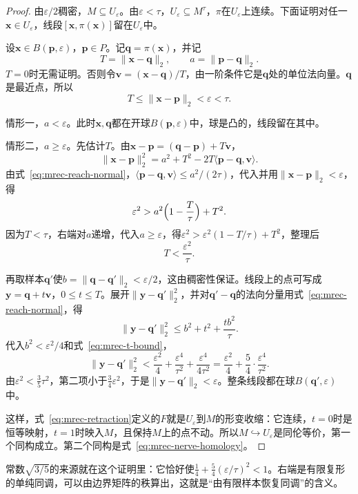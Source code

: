 \begin{proof}
由$\varepsilon/2$稠密，$M\subseteq U_\varepsilon$。由$\varepsilon<\tau$，$U_\varepsilon\subseteq M^\tau$，$\pi$在$U_\varepsilon$上连续。下面证明对任一$\bm x\in U_\varepsilon$，线段$[\bm x,\pi(\bm x)]$留在$U_\varepsilon$中。

设$\bm x\in B(\bm p,\varepsilon)$，$\bm p\in P$。记$\bm q=\pi(\bm x)$，并记
\[
 T=\lVert\bm x-\bm q\rVert_2,\qquad a=\lVert\bm p-\bm q\rVert_2 .
\]
$T=0$时无需证明。否则令$\bm v=(\bm x-\bm q)/T$，由一阶条件它是$\bm q$处的单位法向量。$\bm q$是最近点，所以
\[
 T\leq\lVert\bm x-\bm p\rVert_2<\varepsilon<\tau .
\]

情形一，$a<\varepsilon$。此时$\bm x,\bm q$都在开球$B(\bm p,\varepsilon)$中，球是凸的，线段留在其中。

情形二，$a\geq\varepsilon$。先估计$T$。由$\bm x-\bm p=(\bm q-\bm p)+T\bm v$，
\[
 \lVert\bm x-\bm p\rVert_2^2=a^2+T^2-2T\langle\bm p-\bm q,\bm v\rangle .
\]
由式~\eqref{eq:mrec-reach-normal}，$\langle\bm p-\bm q,\bm v\rangle\leq a^2/(2\tau)$，代入并用$\lVert\bm x-\bm p\rVert_2<\varepsilon$，得
\[
 \varepsilon^2>a^2\Bigl(1-\frac T\tau\Bigr)+T^2 .
\]
因为$T<\tau$，右端对$a$递增，代入$a\geq\varepsilon$，得$\varepsilon^2>\varepsilon^2(1-T/\tau)+T^2$，整理后
\begin{equation}
 T<\frac{\varepsilon^2}\tau .
 \label{eq:mrec-t-bound}
\end{equation}

再取样本$\bm q'$使$b=\lVert\bm q-\bm q'\rVert_2<\varepsilon/2$，这由稠密性保证。线段上的点可写成$\bm y=\bm q+t\bm v$，$0\leq t\leq T$。展开$\lVert\bm y-\bm q'\rVert_2^2$，并对$\bm q'-\bm q$的法向分量用式~\eqref{eq:mrec-reach-normal}，得
\[
 \lVert\bm y-\bm q'\rVert_2^2\leq b^2+t^2+\frac{tb^2}\tau .
\]
代入$b^2<\varepsilon^2/4$和式~\eqref{eq:mrec-t-bound}，
\[
 \lVert\bm y-\bm q'\rVert_2^2<\frac{\varepsilon^2}4+\frac{\varepsilon^4}{\tau^2}+\frac{\varepsilon^4}{4\tau^2}=\frac{\varepsilon^2}4+\frac54\cdot\frac{\varepsilon^4}{\tau^2}.
\]
由$\varepsilon^2<\tfrac35\tau^2$，第二项小于$\tfrac34\varepsilon^2$，于是$\lVert\bm y-\bm q'\rVert_2<\varepsilon$。整条线段都在球$B(\bm q',\varepsilon)$中。

这样，式~\eqref{eq:mrec-retraction}定义的$F$就是$U_\varepsilon$到$M$的形变收缩：它连续，$t=0$时是恒等映射，$t=1$时映入$M$，且保持$M$上的点不动。所以$M\hookrightarrow U_\varepsilon$是同伦等价，第一个同构成立。第二个同构是式~\eqref{eq:mrec-nerve-homology}。
\end{proof}

常数$\sqrt{3/5}$的来源就在这个证明里：它恰好使$\tfrac14+\tfrac54(\varepsilon/\tau)^2<1$。右端是有限复形的单纯同调，可以由边界矩阵的秩算出，这就是“由有限样本恢复同调”的含义。


